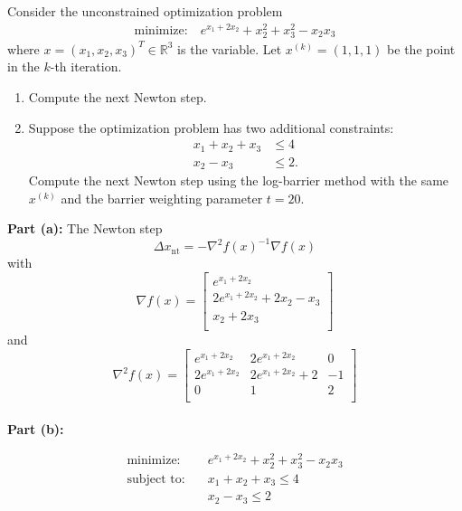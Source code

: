 \documentclass[11pt]{article}
\begin{document}
\pagebreak

\begin{homeworkProblem}

    Consider the unconstrained optimization problem
    \begin{align*}
        \text{minimize:} \quad e^{x_1 + 2x_2} + x_2^2 + x_3^2 - x_2 x_3
    \end{align*}
    where $x = (x_1, x_2, x_3)^T \in \mathbb{R}^3$ is the variable. Let $x^{(k)} = (1, 1, 1)$ be the point in the $k$-th
    iteration.
    \begin{enumerate}[label=(\alph*), topsep=5pt, itemsep=5pt]
        \item Compute the next Newton step.
        \item Suppose the optimization problem has two additional constraints:
              \begin{align*}
                  x_1 + x_2 + x_3 & \leq 4  \\
                  x_2 - x_3       & \leq 2.
              \end{align*}
              Compute the next Newton step using the log-barrier method with the same $x^{(k)}$ and the
              barrier weighting parameter $t = 20$. \newline
    \end{enumerate}
    \solution

    \textbf{Part (a):} The Newton step
    \[
        \Delta x_\text{nt} = - \nabla^2 f(x)^{-1} \nabla f(x)
    \]
    with
    \[
        \nabla f(x) = \begin{bmatrix}
            e^{x_1 + 2x_2}               \\
            2e^{x_1 + 2x_2} + 2x_2 - x_3 \\
            x_2 + 2x_3                   \\
        \end{bmatrix}
    \]
    and
    \[
        \nabla^2 f(x) = \begin{bmatrix}
            e^{x_1 + 2x_2}  & 2e^{x_1 + 2x_2}     & 0  \\
            2e^{x_1 + 2x_2} & 2e^{x_1 + 2x_2} + 2 & -1 \\
            0               & 1                   & 2  \\
        \end{bmatrix}
    \] \\

    \textbf{Part (b):}

    \begin{align*}
        \text{minimize:} \quad   & e^{x_1 + 2x_2} + x_2^2 + x_3^2 - x_2 x_3 \\
        \text{subject to:} \quad & x_1 + x_2 + x_3 \leq 4                   \\
                                 & x_2 - x_3 \leq 2
    \end{align*}


\end{homeworkProblem}
\end{document}
